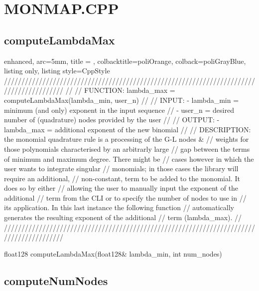 \documentclass[a4paper, twosided]{book}
\begin{document}
\newpage
\section[MonMap.cpp]{\changefont MONMAP.CPP}\label{Sec4.1}

\subsection[computeLambdaMax]{\changefont computeLambdaMax}\label{SubSec4.1.1}

\begin{tcblisting}{enhanced,
                   arc=5mm,
                   title = \color{black}{\large \ttfamily MonMap.cpp/computeLambdaMax},
                   colbacktitle=poliOrange,
                   colback=poliGrayBlue,
                   listing only,
                   listing style=CppStyle}
/////////////////////////////////////////////////////////////////////////////////////////
//
//       FUNCTION: lambda_max = computeLambdaMax(lambda_min, user_n)
//                
//          INPUT: - lambda_min = minimum (and only) exponent in the input sequence
//                 - user_n = desired number of (quadrature) nodes provided by the user
//
//         OUTPUT: - lambda_max = additional exponent of the new binomial
//
//    DESCRIPTION: the monomial quadrature rule is a processing of the G-L nodes & 
//                 weights for those polynomials characterised by an arbitrarly large
//                 gap between the terms of minimum and maximum degree. There might be
//                 cases however in which the user wants to integrate singular 
//                 monomials; in those cases the library will require an additional, 
//                 non-constant, term to be added to the monomial. It does so by either 
//                 allowing the user to manually input the exponent of the additional
//                 term from the CLI or to specify the number of nodes to use in
//                 its application. In this last instance the following function 
//                 automatically generates the resulting exponent of the additional
//                 term (lambda_max).
//
/////////////////////////////////////////////////////////////////////////////////////////

float128 computeLambdaMax(float128& lambda_min, int num_nodes)
\end{tcblisting}

\subsection[computeNumNodes]{\changefont computeNumNodes}\label{SubSec4.1.2}
\end{document}
